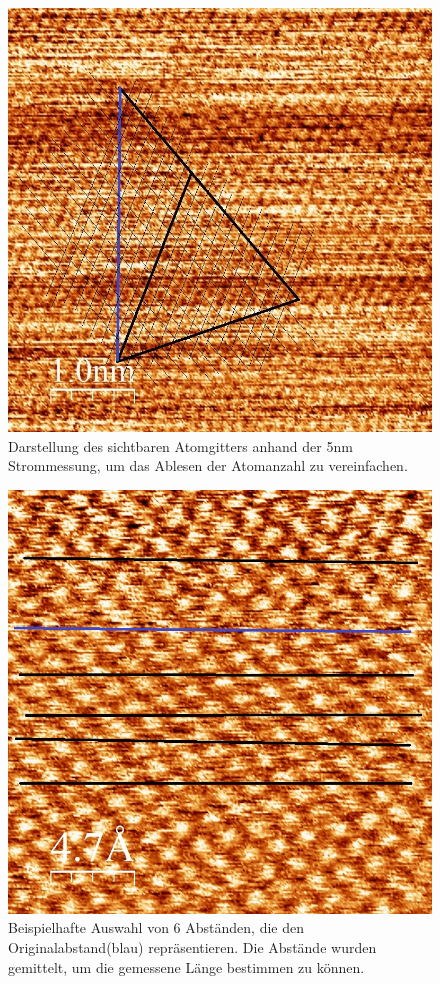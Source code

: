 \documentclass[12pt,a4paper]{article}
\begin{document}
\begin{figure}
\centering
\includegraphics[scale=0.6]{Bilder/Atome/strom5_v_gitter.jpg}
\caption{Darstellung des sichtbaren Atomgitters anhand der 5nm Strommessung, um das Ablesen der Atomanzahl zu vereinfachen.}
\label{fig:strom5_symmetire}
\end{figure}

\begin{figure}
\centering
\includegraphics[scale=0.54]{Bilder/Atome/hoch2_abstand.jpg}
\caption{Beispielhafte Auswahl von 6 Abständen, die den Originalabstand(blau) repräsentieren. Die Abstände wurden gemittelt, um die gemessene Länge bestimmen zu können.}
\label{fig:strom2_abstand}
\end{figure}
\end{document}

